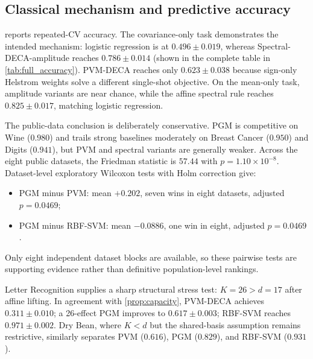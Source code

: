 \documentclass[10pt,twocolumn]{article}
\theoremstyle{definition}
\theoremstyle{remark}
\begin{document}
\subsection{Classical mechanism and predictive accuracy}

 reports repeated-CV accuracy.  The covariance-only
task demonstrates the intended mechanism: logistic regression is at
$0.496\pm0.019$, whereas Spectral-DECA-amplitude reaches
$0.786\pm0.014$ (shown in the complete table in
\cref{tab:full_accuracy}).  PVM-DECA reaches only $0.623\pm0.038$ because
sign-only Helstrom weights solve a different single-shot objective.  On the
mean-only task, amplitude variants are near chance, while the affine spectral
rule reaches $0.825\pm0.017$, matching logistic regression.

\begin{table}[t]
\centering
\caption{Accuracy (mean $\pm$ standard deviation over two repeats of
five-fold stratified CV).  A: amplitude encoding; F: affine encoding.
Configurations are fixed rather than nested-tuned.}
\label{tab:main_accuracy}
\resizebox{\textwidth}{!}{}
\end{table}

The public-data conclusion is deliberately conservative.  PGM is competitive
on Wine ($0.980$) and trails strong baselines moderately on Breast Cancer
($0.950$) and Digits ($0.941$), but PVM and spectral variants are generally
weaker.  Across the eight public datasets, the Friedman statistic is $57.44$
with $p=1.10\times10^{-8}$.  Dataset-level exploratory Wilcoxon tests with
Holm correction give:
\begin{itemize}
  \item PGM minus PVM: mean $+0.202$, seven wins in eight datasets,
  adjusted $p=0.0469$;
  \item PGM minus RBF-SVM: mean $-0.0886$, one win in eight,
  adjusted $p=0.0469$.
\end{itemize}
Only eight independent dataset blocks are available, so these pairwise tests
are supporting evidence rather than definitive population-level rankings.

Letter Recognition supplies a sharp structural stress test:
$K=26>d=17$ after affine lifting.  In agreement with
\cref{prop:capacity}, PVM-DECA achieves $0.311\pm0.010$; a 26-effect PGM
improves to $0.617\pm0.003$; RBF-SVM reaches $0.971\pm0.002$.
Dry Bean, where $K<d$ but the shared-basis assumption remains restrictive,
similarly separates PVM ($0.616$), PGM ($0.829$), and RBF-SVM ($0.931$).
\end{document}
